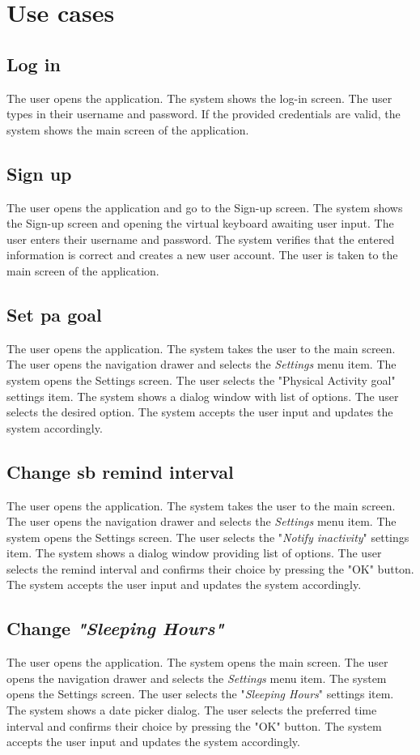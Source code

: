 \chapter{Use cases}
\label{use_cases}
\section*{Log in}
    The user opens the application. The system shows the log-in screen. The user types in their username and password. If the provided credentials are valid, the system shows the main screen of the application.
    
\section*{Sign up}
    The user opens the application and go to the Sign-up screen. The system shows the Sign-up screen and opening the virtual keyboard awaiting user input. The user enters their username and password. The system verifies that the entered information is correct and creates a new user account. The user is taken to the main screen of the application.
    
\section*{Set \gls{pa} goal}
    The user opens the application. The system takes the user to the main screen. The user opens the navigation drawer and selects the \textit{Settings} menu item. The system opens the Settings screen. The user selects the "Physical Activity goal" settings item. The system shows a dialog window with list of options. The user selects the desired option. The system accepts the user input and updates the system accordingly.

\section*{Change \gls{sb} remind interval}
    The user opens the application. The system takes the user to the main screen. The user opens the navigation drawer and selects the \textit{Settings} menu item. The system opens the Settings screen. The user selects the "\textit{Notify inactivity}" settings item. The system shows a dialog window providing list of options. The user selects the remind interval and confirms their choice by pressing the "OK" button. The system accepts the user input and updates the system accordingly. 
    
\section*{Change \textit{"Sleeping Hours"}}
    The user opens the application. The system opens the main screen. The user opens the navigation drawer and selects the \textit{Settings} menu item. The system opens the Settings screen. The user selects the "\textit{Sleeping Hours}" settings item. The system shows a date picker dialog. The user selects the preferred time interval and confirms their choice by pressing the "OK" button. The system accepts the user input and updates the system accordingly.
    

